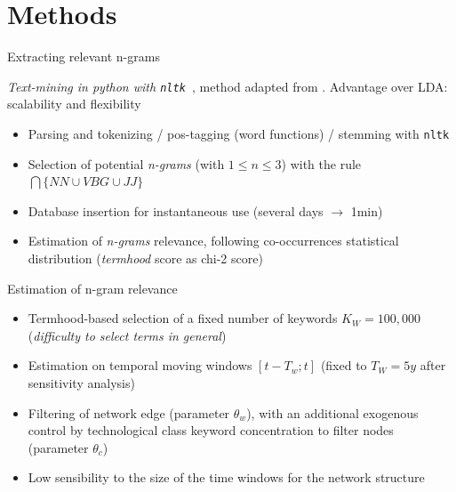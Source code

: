 \documentclass{beamer}
\begin{document}
\section{Methods}
\begin{frame}{Extracting relevant n-grams}
    
    
    \textit{Text-mining in python with \texttt{nltk}~\cite{bird2006nltk}}, method adapted from
\cite{chavalarias2013phylomemetic}. Advantage over LDA: scalability and flexibility

   

\bigskip

\begin{itemize}
\item Parsing and tokenizing / pos-tagging (word functions) / stemming  with \texttt{nltk}
\item Selection of potential \textit{n-grams} (with $1 \leq n \leq 3$) with the rule $\bigcap \{NN \cup VBG \cup JJ \}$
\item Database insertion for instantaneous use (several days $\rightarrow$ 1min)
\item Estimation of \textit{n-grams} relevance, following co-occurrences statistical distribution (\textit{termhood} score as chi-2 score)
\end{itemize}
\end{frame}

\begin{frame}{Estimation of n-gram relevance}
    
    \begin{itemize}
        \item Termhood-based selection of a fixed number of keywords $K_W = 100,000$ (\textit{difficulty to select terms in general})
        \item Estimation on temporal moving windows $\left[t - T_w ; t\right]$ (fixed to $T_W = 5y$ after sensitivity analysis)
        \item Filtering of network edge (parameter $\theta_w$), with an additional exogenous control by technological class keyword concentration to filter nodes (parameter $\theta_c$)
        \item Low sensibility to the size of the time windows for the network structure %
    \end{itemize}
    
\end{frame}
\end{document}
